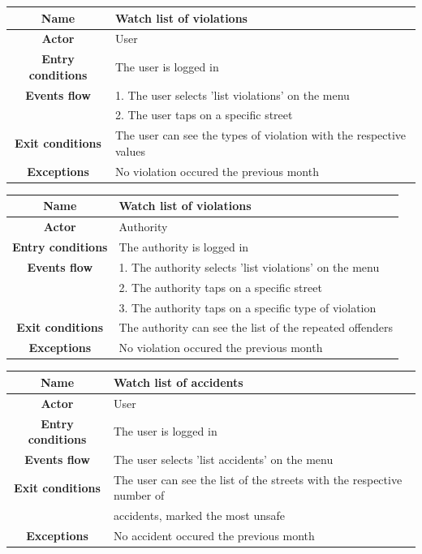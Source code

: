 \begin{flushleft}
\begin{tabular}{|c|l|}
\hline
\textbf{Name} & Watch list of violations\\ \hline
\textbf{Actor} & User\\ \hline
\textbf{Entry conditions} &  The user is logged in\\ \hline
\textbf{Events flow} & 1. The user selects 'list violations' on the menu\\& 2. The user taps on a specific street\\ \hline
\textbf{Exit conditions} &  The user can see the types of violation with the respective values\\ \hline
\textbf{Exceptions} & No violation occured the previous month\\
\hline 
\end{tabular}
\end{flushleft}

\begin{flushleft}
\begin{tabular}{|c|l|}
\hline
\textbf{Name} & Watch list of violations\\ \hline
\textbf{Actor} & Authority\\ \hline
\textbf{Entry conditions} &  The authority is logged in\\ \hline
\textbf{Events flow} & 1. The authority selects 'list violations' on the menu\\& 2. The authority taps on a specific street\\& 3. The authority taps on a specific type of violation\\ \hline
\textbf{Exit conditions} &  The authority can see the list of the repeated offenders\\ \hline
\textbf{Exceptions} & No violation occured the previous month\\
\hline 
\end{tabular} 
\end{flushleft}

\begin{flushleft}
\begin{tabular}{|c|l|}
\hline
\textbf{Name} & Watch list of accidents\\ \hline
\textbf{Actor} & User\\ \hline
\textbf{Entry conditions} & The user is logged in\\ \hline
\textbf{Events flow} & The user selects 'list accidents' on the menu\\ \hline
\textbf{Exit conditions} & The user can see the list of the streets with the respective number of\\& accidents, marked the most unsafe\\ \hline
\textbf{Exceptions} & No accident occured the previous month\\
\hline 
\end{tabular}
\end{flushleft}


